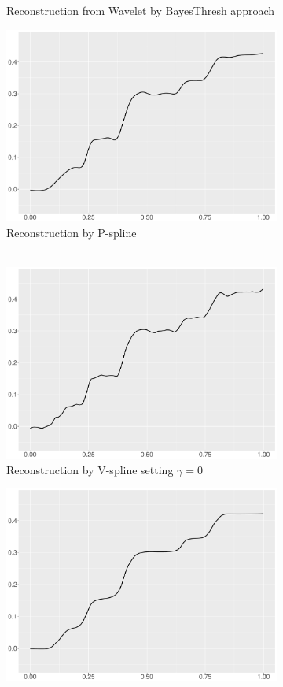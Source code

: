 \begin{figure}
\begin{subfigure}{0.45\textwidth}
    \caption{Reconstruction from Wavelet by BayesThresh approach}
    \end{subfigure}
    \begin{subfigure}{0.45\textwidth}
    \centering
    \includegraphics[width=\linewidth,height=0.45\textwidth]{Chapters/02TractorSplineTheory/plot/ggplot/ggBumpsPSpline.pdf}
    \caption{Reconstruction by P-spline \\\mbox{  } }
    \end{subfigure}
    \begin{subfigure}{0.45\textwidth}
    \centering
    \includegraphics[width=\linewidth,height=0.45\textwidth]{Chapters/02TractorSplineTheory/plot/ggplot/ggBumpsGamma.pdf}
    \caption{Reconstruction by V-spline setting $\gamma=0$}
    \end{subfigure}
  \begin{subfigure}{0.45\textwidth}
    \centering
    \includegraphics[width=\linewidth,height=0.45\textwidth]{Chapters/02TractorSplineTheory/plot/ggplot/ggBumpsTractorAPT.pdf}

\end{subfigure}
\end{figure}
